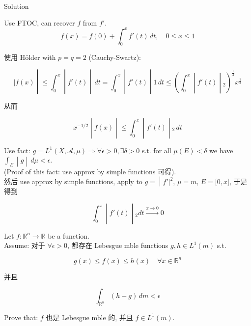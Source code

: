 \documentclass{qlnotes-export}
\begin{document}
\begin{qlsolution}{Solution}

Use FTOC, can recover \(f\) from \(f'\).\\

\[f(x) = f(0) + \int_{0}^{x}f'(t)\, dt,\quad 0 \leq x \leq 1\]

使用 Hölder with \(p = q = 2\) (Cauchy-Swartz):

\[\left. |f(x) \middle| \leq \int_{0}^{x} \middle| f'(t) \middle| \, dt = \int_{0}^{x} \middle| f'(t) \middle| 1\, dt \leq (\int_{0}^{x} \middle| f'(t) \middle| {}_{2})^{\frac{1}{2}}x^{\frac{1}{2}} \right.\]

从而

\[\left. x^{- 1/2} \middle| f(x) \middle| \leq \int_{0}^{x} \middle| f'(t) \middle| {}_{2}\, dt \right.\]

Use fact: \(g = L^{1}(X,\mathcal{A},\mu)\Longrightarrow\forall\epsilon > 0,\exists\delta > 0\) s.t. for all \(\mu(E) < \delta\) we have \(\left. \int_{E} \middle| g \middle| \, d\mu < \epsilon \right.\).\\
(Proof of this fact: use approx by simple functions 可得).\\
然后 use approx by simple functions, apply to \(\left. g = \middle| f'|^{2} \right.\), \(\mu = m\), \(E = \lbrack 0,x\rbrack\), 于是得到

\[\left. \int_{0}^{x} \middle| f'(t) \middle| {}_{2}dt\overset{x\rightarrow 0}{\rightarrow}0 \right.\]

\end{qlsolution}

\begin{example}

Let \(f:{\mathbb{R}}^{n}\rightarrow{\mathbb{R}}\) be a function.\\
Assume: 对于 \(\forall\epsilon > 0\), 都存在 Lebesgue mble functions \(g,h \in L^{1}(m)\) s.t.

\[g(x) \leq f(x) \leq h(x)\quad\forall x \in {\mathbb{R}}^{n}\]

并且

\[\int_{{\mathbb{R}}^{n}}(h - g)\, dm < \epsilon\]

Prove that: \(f\) 也是 Lebesgue mble 的, 并且 \(f \in L^{1}(m)\).\\

\end{example}
\end{document}
